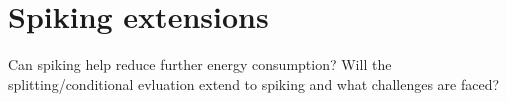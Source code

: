 \section{Spiking extensions}
\label{sec:spiking}
Can spiking help reduce further energy consumption? Will the splitting/conditional evluation
extend to spiking and what challenges are faced?

